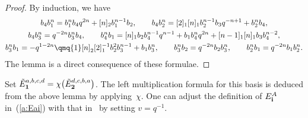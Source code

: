 \begin{proof}
 By induction, we have
\begin{gather*}
 {b_4 b_1^n} = {b_1^n b_4} q^{2 n}+[n]_2 {b_1^{n-1}b_2},\qquad
 {b_4 b_2^n} = [2]_1 [n]_1 {b_2^{n-1} b_3} q^{-n+1}+{b_2^n b_4},\\
 {b_4 b_3^n} = q^{-2 n} {b_3^n b_4},\qquad
 {b_4^n b_1} = [n]_1 {b_2 b_4^{n-1}} q^{n-1}+{b_1 b_4^n} q^{2 n}+[n-1]_1 [n]_1 {b_3 b_4^{n-2}},\\
 {b_3^n b_1} = -q^{1-2 n}\qmq{1} [n]_2 [2]_1^{-1} {b_2^2 b_3^{n-1}}+{b_1 b_3^n},\qquad
 {b_3^n b_2} = q^{-2 n} {b_2 b_3^n},\qquad
 {b_2^n b_1} = q^{-2 n} {b_1 b_2^n}.
 \end{gather*}
The lemma is a direct consequence of these formulae.
\end{proof}

Set ${\tilde E}_{\bf 1}^{a,b,c,d} = \chi\big({\tilde E}^{d,c,b,a}_{\bf 2}\big)$.
The left multiplication formula for this basis is deduced from
the above lemma by applying~$\chi$.
One can adjust the def\/inition of
$E^A_{\bf i}$ in~(\ref{a:Eai}) with that in~\cite{Xi} by setting $v=q^{-1}$.

